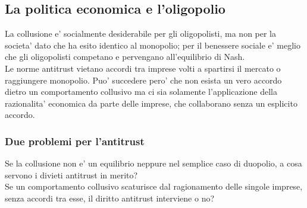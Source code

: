 \documentclass{report}
\begin{document}
	\subsection{La politica economica e l'oligopolio}
	La collusione e' socialmente desiderabile per gli oligopolisti, ma non per la societa' dato che ha esito identico al monopolio; per il benessere sociale e' meglio che gli oligopolisti competano e pervengano all'equilibrio di Nash.
	\medskip \\Le norme antitrust vietano accordi tra imprese volti a spartirsi il mercato o raggiungere monopolio. Puo' succedere pero' che non esista un vero accordo dietro un comportamento collusivo ma ci sia solamente l'applicazione della razionalita' economica da parte delle imprese, che collaborano senza un esplicito accordo.
	\subsubsection{Due problemi per l'antitrust}
	Se la collusione non e' un equilibrio neppure nel semplice caso di duopolio, a cosa servono i divieti antitrust in merito?
	\medskip \\Se un comportamento collusivo scaturisce dal ragionamento delle singole imprese, senza accordi tra esse, il diritto antitrust interviene o no?
\end{document}

